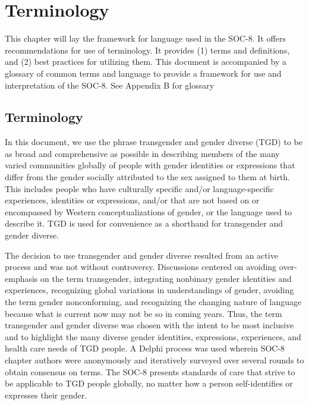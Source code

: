 \documentclass[
]{book}
\begin{document}
\hypertarget{terminology}{%
\chapter{Terminology}\label{terminology}}

This chapter will lay the framework for language used in the SOC-8. It offers recommendations for use of terminology. It provides (1)
terms and definitions, and (2) best practices
for utilizing them. This document is accompanied by a glossary of common terms and language to provide a framework for use and
interpretation of the SOC-8. See Appendix B
for glossary

\hypertarget{terminology-1}{%
\section*{Terminology}\label{terminology-1}}

In this document, we use the phrase transgender
and gender diverse (TGD) to be as broad and
comprehensive as possible in describing members
of the many varied communities globally of people with gender identities or expressions that
differ from the gender socially attributed to the
sex assigned to them at birth. This includes people who have culturally specific and/or
language-specific experiences, identities or expressions, and/or that are not based on or encompassed by Western conceptualizations of gender,
or the language used to describe it. TGD is used
for convenience as a shorthand for transgender
and gender diverse.

The decision to use transgender and gender
diverse resulted from an active process and was
not without controversy. Discussions centered on
avoiding over-emphasis on the term transgender,
integrating nonbinary gender identities and experiences, recognizing global variations in understandings of gender, avoiding the term gender
nonconforming, and recognizing the changing
nature of language because what is current now
may not be so in coming years. Thus, the term
transgender and gender diverse was chosen with
the intent to be most inclusive and to highlight
the many diverse gender identities, expressions,
experiences, and health care needs of TGD people. A Delphi process was used wherein SOC-8
chapter authors were anonymously and iteratively
surveyed over several rounds to obtain consensus
on terms. The SOC-8 presents standards of care
that strive to be applicable to TGD people globally, no matter how a person self-identifies or
expresses their gender.
\end{document}
